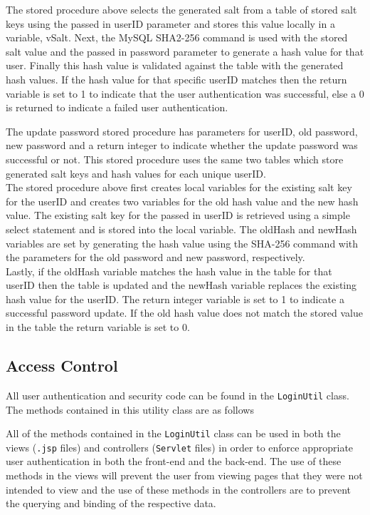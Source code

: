 \documentclass{article}
\begin{document}
The stored procedure above selects the generated salt from a table of stored salt keys using the passed in userID parameter and stores this value locally in a variable, vSalt. Next, the MySQL SHA2-256 command is used with the stored salt value and the passed in password parameter to generate a hash value for that user. Finally this hash value is validated against the table with the generated hash values. If the hash value for that specific userID matches then the return variable is set to 1 to indicate that the user authentication was successful, else a 0 is returned to indicate a failed user authentication.



The update password stored procedure has parameters for userID, old password, new password and a return integer to indicate whether the update password was successful or not. This stored procedure uses the same two tables which store generated salt keys and hash values for each unique userID. \\

The stored procedure above first creates local variables for the existing salt key for the userID and creates two variables for the old hash value and the new hash value. The existing salt key for the passed in userID is retrieved using a simple select statement and is stored into the local variable. The oldHash and newHash variables are set by generating the hash value using the SHA-256 command with the parameters for the old password and new password, respectively. \\

Lastly, if the oldHash variable matches the hash value in the table for that userID then the table is updated and the newHash variable replaces the existing hash value for the userID. The return integer variable is set to 1 to indicate a successful password update. If the old hash value does not match the stored value in the table the return variable is set to 0.

\subsection{Access Control}
All user authentication and security code can be found in the \texttt{LoginUtil} class. The methods contained in this utility class are as follows



All of the methods contained in the \texttt{LoginUtil} class can be used in both the views (\texttt{.jsp} files) and controllers (\texttt{Servlet} files) in order to enforce appropriate user authentication in both the front-end and the back-end. The use of these methods in the views will prevent the user from viewing pages that they were not intended to view and the use of these methods in the controllers are to prevent the querying and binding of the respective data. \\
\end{document}
